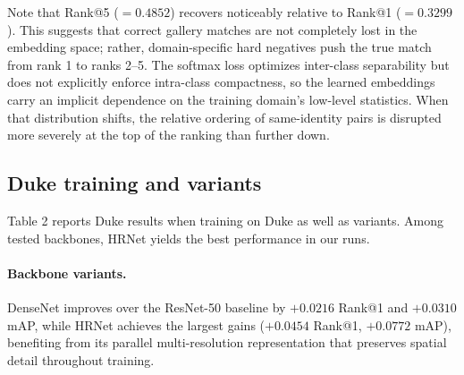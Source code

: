 \documentclass[sigconf,nonacm]{acmart}
\begin{document}
Note that Rank@5 ($=0.4852$) recovers noticeably relative to Rank@1 ($=0.3299$).
This suggests that correct gallery matches are not completely lost in the embedding space; rather, domain-specific hard negatives push the true match from rank 1 to ranks 2--5.
The softmax loss optimizes inter-class separability but does not explicitly enforce intra-class compactness, so the learned embeddings carry an implicit dependence on the training domain's low-level statistics.
When that distribution shifts, the relative ordering of same-identity pairs is disrupted more severely at the top of the ranking than further down.

\subsection{Duke training and variants}
Table 2 reports Duke results when training on Duke as well as variants.
Among tested backbones, HRNet yields the best performance in our runs.

\paragraph{Backbone variants.}
DenseNet improves over the ResNet-50 baseline by $+0.0216$ Rank@1 and $+0.0310$ mAP, while HRNet achieves the largest gains ($+0.0454$ Rank@1, $+0.0772$ mAP), benefiting from its parallel multi-resolution representation that preserves spatial detail throughout training.
\end{document}

